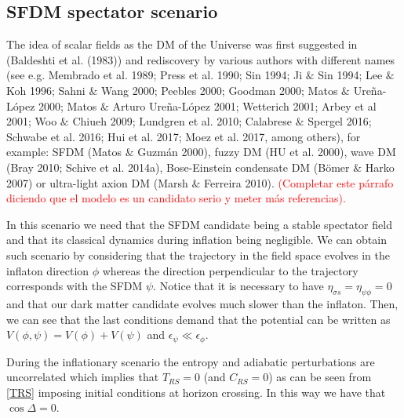 \documentclass[a4paper,fleqn,usenatbib,useAMS]{mnras}
\begin{document}
\subsection{SFDM spectator scenario}
The idea of scalar fields as the DM of the Universe was first suggested in (Baldeshti et al. (1983)) and rediscovery by various authors with different names (see e.g. Membrado et al. 1989; Press et al. 1990; Sin 1994; Ji $\&$ Sin 1994; Lee $\&$ Koh 1996; Sahni $\&$ Wang 2000; Peebles 2000; Goodman 2000; Matos $\&$ Ure\~na-L\'opez 2000; Matos $\&$ Arturo Ure\~na-L\'opez 2001; Wetterich 2001; Arbey et al 2001; Woo $\&$ Chiueh 2009; Lundgren et al. 2010; Calabrese $\&$ Spergel 2016; Schwabe et al. 2016; Hui et al. 2017; Moez et al. 2017, among others), for example: SFDM (Matos $\&$ Guzm\'an 2000), fuzzy DM (HU et al. 2000), wave DM (Bray 2010; Schive et al. 2014a), Bose-Einstein condensate DM (B\"omer $\&$ Harko 2007) or ultra-light axion DM (Marsh $\&$ Ferreira 2010). \textcolor{red}{(Completar este p\'arrafo diciendo que el modelo es un candidato serio y meter m\'as referencias).} 


In this scenario we need that the SFDM candidate being a stable spectator field and that its classical dynamics during inflation being negligible. We can obtain such scenario by considering that the trajectory in the field space evolves in the inflaton direction $\phi$ whereas the direction perpendicular to the trajectory corresponds with the SFDM $\psi$. Notice that it is necessary to have $\eta_{\sigma s}=\eta_{\psi\phi}=0$ and that our dark matter candidate evolves much slower than the inflaton. Then, we can see that the last conditions demand that the potential can be written as $V(\phi,\psi)=V(\phi)+V(\psi)$ and $\epsilon_\psi\ll \epsilon_\phi$.

During the inflationary scenario the entropy and adiabatic perturbations are uncorrelated which implies that $T_{RS}=0$ (and $C_{RS}=0$) as can be seen from \eqref{TRS} imposing initial conditions at horizon crossing. In this way we have that $\cos\Delta =0$. 
\end{document}
